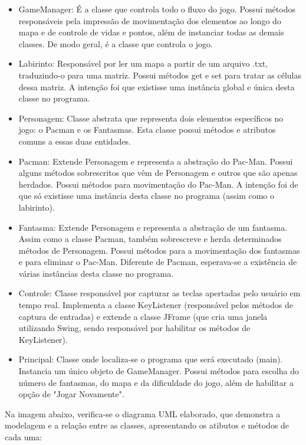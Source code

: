 \documentclass[]{article}
\begin{document}
\begin{itemize}
	\item GameManager: É a classe que controla todo o fluxo do jogo. Possui métodos responsáveis pela impressão de movimentação dos elementos ao longo do mapa e de controle de vidas e pontos, além de instanciar todas as demais classes. De modo geral, é a classe que controla o jogo. 
	\item Labirinto: Responsável por ler um mapa a partir de um arquivo .txt, traduzindo-o para uma matriz. Possui métodos get e set para tratar as células dessa matriz. A intenção foi que existisse uma instância global e única desta classe no programa.
	\item Personagem: Classe abstrata que representa dois elementos específicos no jogo: o Pacman e os Fantasmas. Esta classe possui métodos e atributos comuns a essas duas entidades.
	\item Pacman: Extende Personagem e representa a abstração do Pac-Man. Possui alguns métodos sobrescritos que vêm de Personagem e outros que são apenas herdados. Possui métodos para movimentação do Pac-Man. A intenção foi de que só existisse uma instância desta classe no programa (assim como o labirinto).
	\item Fantasma: Extende Personagem e representa a abstração de um fantasma. Assim como a classe Pacman, também sobrescreve e herda determinados métodos de Personagem. Possui métodos para a movimentação dos fantasmas e para eliminar o Pac-Man. Diferente de Pacman, esperava-se a existência de várias instâncias desta classe no programa.
	\item Controle: Classe responsável por capturar as teclas apertadas pelo usuário em tempo real. Implementa a classe KeyListener (responsável pelos métodos de captura de entradas) e extende a classe JFrame (que cria uma janela utilizando Swing, sendo responsável por habilitar os métodos de KeyListener).
	\item Principal: Classe onde localiza-se o programa que será executado (main). Instancia um  único objeto de GameManager. Possui métodos para escolha do número de fantasmas, do mapa e da dificuldade do jogo, além de habilitar a opção de "Jogar Novamente".
\end{itemize}

Na imagem abaixo, verifica-se o diagrama UML elaborado, que demonstra a modelagem e a relação entre as classes, apresentando os atibutos e métodos de cada uma:
\end{document}
